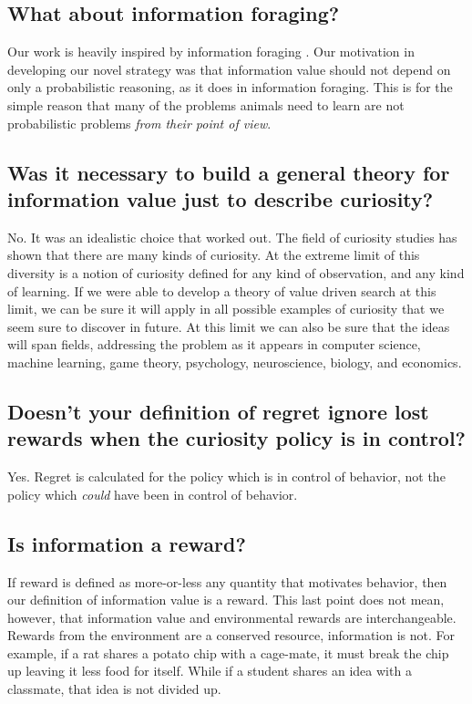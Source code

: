 \subsection*{What about information foraging?}
Our work is heavily inspired by information foraging \cite{Inglis2001,Reddy2016}. Our motivation in developing our novel strategy was that information value should not depend on only a probabilistic reasoning, as it does in information foraging. This is for the simple reason that many of the problems animals need to learn are not probabilistic problems \textit{from their point of view}. 


\subsection*{Was it necessary to build a general theory for information value just to describe curiosity?}
No. It was an idealistic choice that worked out. The field of curiosity studies has shown that there are many kinds of curiosity. At the extreme limit of this diversity is a notion of curiosity defined for any kind of observation, and any kind of learning. If we were able to develop a theory of value driven search at this limit, we can be sure it will apply in all possible examples of curiosity that we seem sure to discover in future. At this limit we can also be sure that the ideas will span fields, addressing the problem as it appears in computer science, machine learning, game theory, psychology, neuroscience, biology, and economics.


\subsection*{Doesn't your definition of regret ignore lost rewards when the curiosity policy is in control?}
Yes. Regret is calculated for the policy which is in control of behavior, not the policy which \textit{could} have been in control of behavior.


\subsection*{Is information a reward?}
If reward is defined as more-or-less any quantity that motivates behavior, then our definition of information value is a reward. This last point does not mean, however, that information value and environmental rewards are interchangeable. Rewards from the environment are a conserved resource, information is not. For example, if a rat shares a potato chip with a cage-mate, it must break the chip up leaving it less food for itself. While if a student shares an idea with a classmate, that idea is not divided up. 

